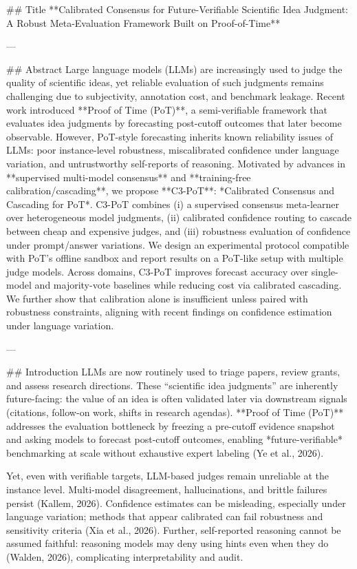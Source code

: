 ## Title  
**Calibrated Consensus for Future-Verifiable Scientific Idea Judgment: A Robust Meta-Evaluation Framework Built on Proof-of-Time**

---

## Abstract  
Large language models (LLMs) are increasingly used to judge the quality of scientific ideas, yet reliable evaluation of such judgments remains challenging due to subjectivity, annotation cost, and benchmark leakage. Recent work introduced **Proof of Time (PoT)**, a semi-verifiable framework that evaluates idea judgments by forecasting post-cutoff outcomes that later become observable. However, PoT-style forecasting inherits known reliability issues of LLMs: poor instance-level robustness, miscalibrated confidence under language variation, and untrustworthy self-reports of reasoning. Motivated by advances in **supervised multi-model consensus** and **training-free calibration/cascading**, we propose **C3-PoT**: *Calibrated Consensus and Cascading for PoT*. C3-PoT combines (i) a supervised consensus meta-learner over heterogeneous model judgments, (ii) calibrated confidence routing to cascade between cheap and expensive judges, and (iii) robustness evaluation of confidence under prompt/answer variations. We design an experimental protocol compatible with PoT’s offline sandbox and report results on a PoT-like setup with multiple judge models. Across domains, C3-PoT improves forecast accuracy over single-model and majority-vote baselines while reducing cost via calibrated cascading. We further show that calibration alone is insufficient unless paired with robustness constraints, aligning with recent findings on confidence estimation under language variation.

---

## Introduction  
LLMs are now routinely used to triage papers, review grants, and assess research directions. These “scientific idea judgments” are inherently future-facing: the value of an idea is often validated later via downstream signals (citations, follow-on work, shifts in research agendas). **Proof of Time (PoT)** addresses the evaluation bottleneck by freezing a pre-cutoff evidence snapshot and asking models to forecast post-cutoff outcomes, enabling *future-verifiable* benchmarking at scale without exhaustive expert labeling (Ye et al., 2026).

Yet, even with verifiable targets, LLM-based judges remain unreliable at the instance level. Multi-model disagreement, hallucinations, and brittle failures persist (Kallem, 2026). Confidence estimates can be misleading, especially under language variation; methods that appear calibrated can fail robustness and sensitivity criteria (Xia et al., 2026). Further, self-reported reasoning cannot be assumed faithful: reasoning models may deny using hints even when they do (Walden, 2026), complicating interpretability and audit.

